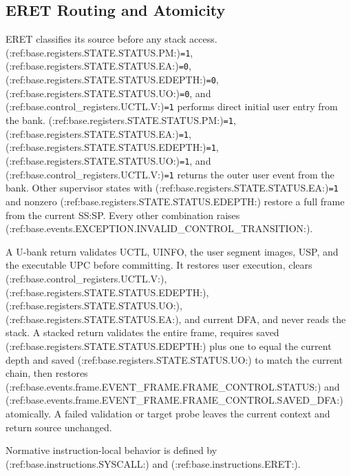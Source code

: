 \subsection{ERET Routing and Atomicity}
ERET classifies its source before any stack access. (:ref:base.registers.STATE.STATUS.PM:)\texttt{=1}, (:ref:base.registers.STATE.STATUS.EA:)\texttt{=0}, (:ref:base.registers.STATE.STATUS.EDEPTH:)\texttt{=0}, (:ref:base.registers.STATE.STATUS.UO:)\texttt{=0}, and (:ref:base.control_registers.UCTL.V:)\texttt{=1} performs direct initial user entry from the bank. (:ref:base.registers.STATE.STATUS.PM:)\texttt{=1}, (:ref:base.registers.STATE.STATUS.EA:)\texttt{=1}, (:ref:base.registers.STATE.STATUS.EDEPTH:)\texttt{=1}, (:ref:base.registers.STATE.STATUS.UO:)\texttt{=1}, and (:ref:base.control_registers.UCTL.V:)\texttt{=1} returns the outer user event from the bank. Other supervisor states with (:ref:base.registers.STATE.STATUS.EA:)\texttt{=1} and nonzero (:ref:base.registers.STATE.STATUS.EDEPTH:) restore a full frame from the current SS:SP. Every other combination raises (:ref:base.events.EXCEPTION.INVALID_CONTROL_TRANSITION:).

A U-bank return validates UCTL, UINFO, the user segment images, USP, and the executable UPC before committing. It restores user execution, clears (:ref:base.control_registers.UCTL.V:), (:ref:base.registers.STATE.STATUS.EDEPTH:), (:ref:base.registers.STATE.STATUS.UO:), (:ref:base.registers.STATE.STATUS.EA:), and current DFA, and never reads the stack. A stacked return validates the entire frame, requires saved (:ref:base.registers.STATE.STATUS.EDEPTH:) plus one to equal the current depth and saved (:ref:base.registers.STATE.STATUS.UO:) to match the current chain, then restores (:ref:base.events.frame.EVENT_FRAME.FRAME_CONTROL.STATUS:) and (:ref:base.events.frame.EVENT_FRAME.FRAME_CONTROL.SAVED_DFA:) atomically. A failed validation or target probe leaves the current context and return source unchanged.

Normative instruction-local behavior is defined by (:ref:base.instructions.SYSCALL:) and (:ref:base.instructions.ERET:).\par
